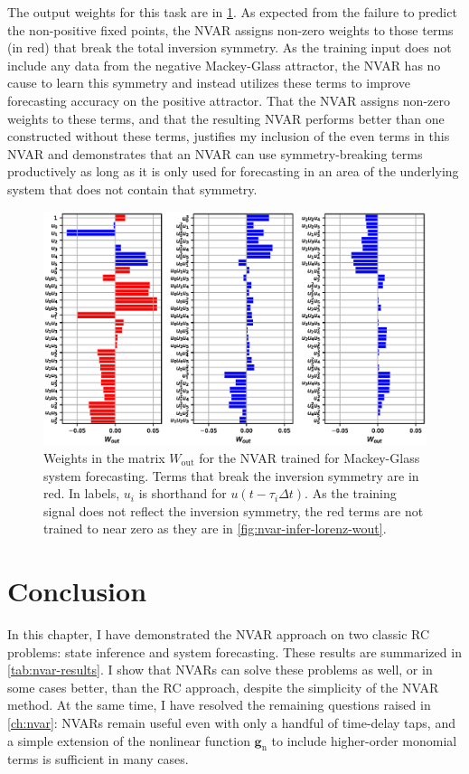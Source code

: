 The output weights for this task are in
\cref{fig:nvar-predict-mackey-glass-wout}. As expected from the
failure to predict the non-positive fixed points, the NVAR
assigns non-zero weights to those terms (in red) that break the
total inversion symmetry. As the training input does not include any
data from the negative Mackey-Glass attractor, the NVAR has no cause
to learn this symmetry and instead utilizes these terms to improve
forecasting accuracy on the positive attractor. That the NVAR assigns
non-zero weights to these terms, and that the resulting NVAR performs
better than one constructed without these terms, justifies my
inclusion of the even terms in this NVAR and demonstrates that an NVAR
can use symmetry-breaking terms productively as long as it is only
used for forecasting in an area of the underlying system that does not
contain that symmetry.

\begin{figure}
  \includegraphics[width=\textwidth]{figures/nvar-predict-mackey-glass-wout}
  \caption{Weights in the matrix $W_\text{out}$ for the NVAR trained
    for Mackey-Glass system forecasting. Terms that break the
    inversion symmetry are in red. In labels, $u_i$ is shorthand for $u(t - \tau_i \Delta t)$. As the training signal does not
    reflect the inversion symmetry, the red terms are not trained to
    near zero as they are in \cref{fig:nvar-infer-lorenz-wout}.}
  \label{fig:nvar-predict-mackey-glass-wout}
\end{figure}

\section{Conclusion}

In this chapter, I have demonstrated the NVAR approach on two classic
RC problems: state inference and system forecasting.
These results are summarized in \cref{tab:nvar-results}.
I show that
NVARs can solve these problems as well, or in some cases better, than
the RC approach, despite the simplicity of the NVAR method. At the
same time, I have resolved the remaining questions raised in
\cref{ch:nvar}: NVARs remain useful even with only a handful of
time-delay taps, and a simple extension of the nonlinear function
$\bm{g}_\text{n}$ to include higher-order monomial terms is sufficient
in many cases.

